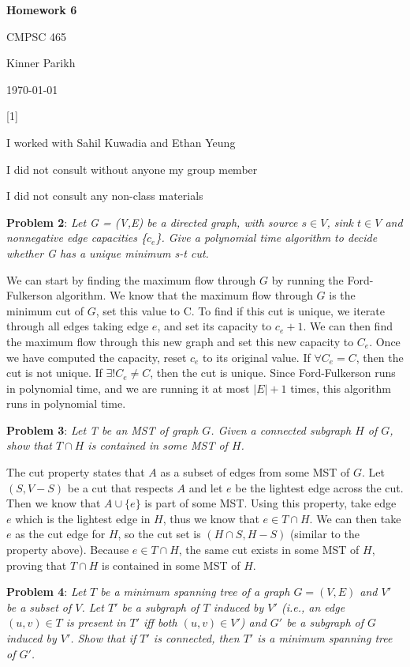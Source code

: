 \documentclass{article} %
\newcommand{\question}[2][]{\begin{flushleft}
        \textbf{Problem #1}: \textit{#2}

\end{flushleft}}
\newcommand{\maketitletwo}[2][]{\begin{center}
        \Large{\textbf{Homework #1}
            
            CMPSC 465} %
        \vspace{5pt}
        
        \normalsize{Kinner Parikh  %
        
        \today}        %
        \vspace{40pt}


        \newpage
        
\end{center}}
\begin{document}
    \maketitletwo[6]  %

    \question[1]{}
    \begin{center}
        
        I worked with Sahil Kuwadia and Ethan Yeung
    
        I did not consult without anyone my group member
    
        I did not consult any non-class materials
    \end{center}
    
    \newpage

    \question[2]{Let G = (V,E) be a directed graph, with source $s\in V$, sink $t \in V$ and nonnegative edge capacities \{$c_e$\}. Give a polynomial time algorithm to decide whether G has a unique minimum s-t cut.}

    We can start by finding the maximum flow through $G$ by running the Ford-Fulkerson algorithm. We know that the maximum flow through $G$ is the minimum cut of $G$, set this value to C. To find if this cut is unique, we iterate through all edges taking edge $e$, and set its capacity to $c_e + 1$. We can then find the maximum flow through this new graph and set this new capacity to $C_e$. Once we have computed the capacity, reset $c_e$ to its original value. If $\forall C_e = C$, then the cut is not unique. If $\exists! C_e \neq C$, then the cut is unique. Since Ford-Fulkerson runs in polynomial time, and we are running it at most $|E| + 1$ times, this algorithm runs in polynomial time.

    \newpage

    \question[3]{Let T be an MST of graph $G$. Given a connected subgraph $H$ of $G$, show that $T \cap H$ is contained in some MST of $H$.}


    The cut property states that $A$ as a subset of edges from some MST of $G$. Let $(S, V-S)$ be a cut that respects $A$ and let $e$ be the lightest edge across the cut. Then we know that $A \cup \{e\}$ is part of some MST. Using this property, take edge $e$ which is the lightest edge in $H$, thus we know that $e \in T \cap H$. We can then take $e$ as the cut edge for $H$, so the cut set is $(H \cap S, H - S)$ (similar to the property above). Because $e \in T \cap H$, the same cut exists in some MST of $H$, proving that $T \cap H$ is contained in some MST of $H$. 

    \newpage

    \question[4]{Let $T$ be a minimum spanning tree of a graph $G = (V,E)$ and $V'$ be a subset of $V$. Let $T'$ be a subgraph of $T$ induced by $V'$ (i.e., an edge $(u,v) \in T$ is present in $T'$ iff both $(u,v) \in V'$) and $G'$ be a subgraph of $G$ induced by $V'$. Show that if $T'$ is connected, then $T'$ is a minimum spanning tree of $G'$.}
\end{document}
